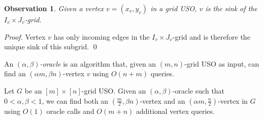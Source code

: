 \documentclass[runningheads,a4paper]{llncs}
\newtheorem{observation}{Observation}
\begin{document}
\begin{observation}\label{Obs:Sink of dominated grid}
Given a vertex  $v = (x_v, y_v)$ in a grid USO, $v$ is the sink of the $I_v\times J_v$-grid.
\end{observation}
\begin{proof}
Vertex $v$ has only incoming edges in the $I_v\times J_v$-grid and is therefore the unique sink of this subgrid. \qed
\end{proof}

An \emph{$(\alpha, \beta)$-oracle} is an algorithm that, given an $(m, n)$-grid USO as input, can find an $(\alpha m, \beta n)$-vertex $v$ using $O(n + m)$ queries.

\begin{lemma}\label{lemma:Climbing lemma}
Let $G$ be an $[m]\times [n]$-grid USO.
Given an $(\alpha, \beta)$-oracle such that $0 < \alpha, \beta  < 1$, we can find both an $(\frac{m}{2}, \beta n)$-vertex and an $(\alpha m, \frac{n}{2})$-vertex in $G$ using $O(1)$ oracle calls and $O(m+n)$ additional vertex queries.
\end{lemma}
\end{document}

